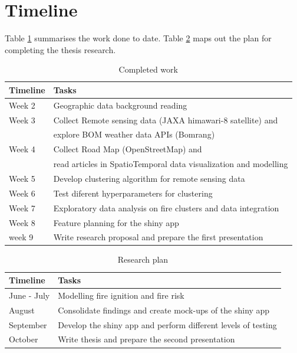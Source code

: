 \documentclass[11pt,a4paper,]{article}
\begin{document}
\hypertarget{timeline}{%
\section{Timeline}\label{timeline}}

Table \ref{tab:timeline1} summarises the work done to date. Table \ref{tab:timeline2} maps out the plan for completing the thesis research.

\begin{table}

\caption{\label{tab:timeline1}Completed work}
\centering
\begin{tabular}[t]{ll}
\toprule
Timeline & Tasks\\
\midrule
Week 2 & Geographic data background reading\\
Week 3 & Collect Remote sensing data (JAXA himawari-8 satellite) and\\
 & explore BOM weather data APIs (Bomrang)\\
Week 4 & Collect Road Map (OpenStreetMap) and\\
 & read articles in SpatioTemporal data visualization and modelling\\
\addlinespace
Week 5 & Develop clustering algorithm for remote sensing data\\
Week 6 & Test diferent hyperparameters for clustering\\
Week 7 & Exploratory data analysis on fire clusters and data integration\\
Week 8 & Feature planning for the shiny app\\
week 9 & Write research proposal and prepare the first presentation\\
\bottomrule
\end{tabular}
\end{table}

\begin{table}

\caption{\label{tab:timeline2}Research plan}
\centering
\begin{tabular}[t]{ll}
\toprule
Timeline & Tasks\\
\midrule
June - July & Modelling fire ignition and fire risk\\
August & Consolidate findings and create mock-ups of the shiny app\\
September & Develop the shiny app and perform different levels of testing\\
October & Write thesis and prepare the second presentation\\
\bottomrule
\end{tabular}
\end{table}
\end{document}
